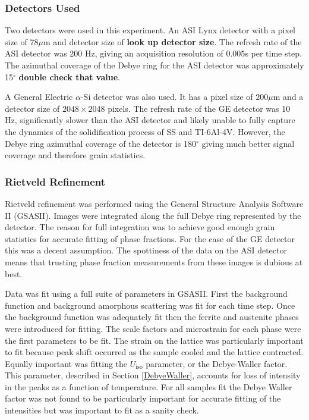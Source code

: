 \subsubsection{Detectors Used}
Two detectors were used in this experiment. An ASI Lynx detector with a pixel size of 78$\mu$m and detector size of \textbf{look up detector size}. The refresh rate of the ASI detector was 200 Hz, giving an acquisition resolution of $0.005$s per time step. The azimuthal coverage of the Debye ring for the ASI detector was approximately 15$^\circ$ \textbf{double check that value}.

A General Electric $\alpha$-Si detector was also used. It has a pixel size of $200\mu$m and a detector size of $2048 \times 2048$ pixels. The refresh rate of the GE detector was 10 Hz, significantly slower than the ASI detector and likely unable to fully capture the dynamics of the solidification process of SS and TI-6Al-4V. However, the Debye ring azimuthal coverage of the detector is 180$^\circ$ giving much better signal coverage and therefore grain statistics. 

\subsubsection{Rietveld Refinement}
Rietveld refinement was performed using the General Structure Analysis Software II (GSASII). Images were integrated along the full Debye ring represented by the detector. The reason for full integration was to achieve good enough grain statistics for accurate fitting of phase fractions. For the case of the GE detector this was a decent assumption. The spottiness of the data on the ASI detector means that trusting phase fraction measurements from these images is dubious at best. 

Data was fit using a full suite of parameters in GSASII. First the background function and background amorphous scattering was fit for each time step. Once the background function was adequately fit then the ferrite and austenite phases were introduced for fitting. The scale factors and microstrain for each phase were the first parameters to be fit. The strain on the lattice was particularly important to fit because peak shift occurred as the sample cooled and the lattice contracted. Equally important was fitting the $U_\text{iso}$ parameter, or the Debye-Waller factor. This parameter, described in Section \ref{DebyeWaller}, accounts for loss of intensity in the peaks as a function of temperature. For all samples fit the Debye Waller factor was not found to be particularly important for accurate fitting of the intensities but was important to fit as a sanity check. 


